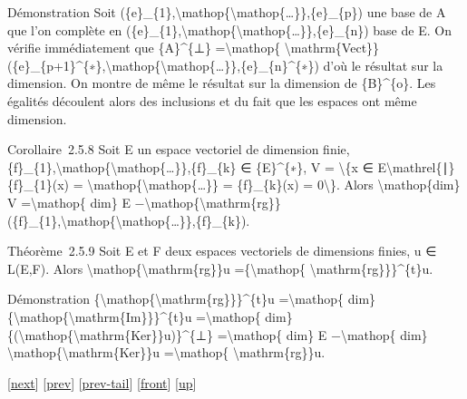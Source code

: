 \documentclass[]{article}
\begin{document}
Démonstration Soit
(\{e\}\_\{1\},\textbackslash{}mathop\{\textbackslash{}mathop\{\ldots{}\}\},\{e\}\_\{p\})
une base de A que l'on complète en
(\{e\}\_\{1\},\textbackslash{}mathop\{\textbackslash{}mathop\{\ldots{}\}\},\{e\}\_\{n\})
base de E. On vérifie immédiatement que \{A\}\^{}\{⊥\}
=\textbackslash{}mathop\{
\textbackslash{}mathrm\{Vect\}\}(\{e\}\_\{p+1\}\^{}\{∗\},\textbackslash{}mathop\{\textbackslash{}mathop\{\ldots{}\}\},\{e\}\_\{n\}\^{}\{∗\})
d'où le résultat sur la dimension. On montre de même le résultat sur la
dimension de \{B\}\^{}\{o\}. Les égalités découlent alors des inclusions
et du fait que les espaces ont même dimension.

Corollaire~2.5.8 Soit E un espace vectoriel de dimension finie,
\{f\}\_\{1\},\textbackslash{}mathop\{\textbackslash{}mathop\{\ldots{}\}\},\{f\}\_\{k\}
∈ \{E\}\^{}\{∗\}, V = \textbackslash{}\{x ∈
E\textbackslash{}mathrel\{∣\}\{f\}\_\{1\}(x) =
\textbackslash{}mathop\{\textbackslash{}mathop\{\ldots{}\}\} =
\{f\}\_\{k\}(x) = 0\textbackslash{}\}. Alors
\textbackslash{}mathop\{dim\} V =\textbackslash{}mathop\{ dim\} E
−\textbackslash{}mathop\{\textbackslash{}mathrm\{rg\}\}(\{f\}\_\{1\},\textbackslash{}mathop\{\textbackslash{}mathop\{\ldots{}\}\},\{f\}\_\{k\}).

Théorème~2.5.9 Soit E et F deux espaces vectoriels de dimensions finies,
u ∈ L(E,F). Alors
\textbackslash{}mathop\{\textbackslash{}mathrm\{rg\}\}u
=\{\textbackslash{}mathop\{ \textbackslash{}mathrm\{rg\}\}\}\^{}\{t\}u.

Démonstration
\{\textbackslash{}mathop\{\textbackslash{}mathrm\{rg\}\}\}\^{}\{t\}u
=\textbackslash{}mathop\{ dim\}
\{\textbackslash{}mathop\{\textbackslash{}mathrm\{Im\}\}\}\^{}\{t\}u
=\textbackslash{}mathop\{ dim\}
\{(\textbackslash{}mathop\{\textbackslash{}mathrm\{Ker\}\}u)\}\^{}\{⊥\}
=\textbackslash{}mathop\{ dim\} E −\textbackslash{}mathop\{ dim\}
\textbackslash{}mathop\{\textbackslash{}mathrm\{Ker\}\}u
=\textbackslash{}mathop\{ \textbackslash{}mathrm\{rg\}\}u.

{[}\href{coursse12.html}{next}{]} {[}\href{coursse10.html}{prev}{]}
{[}\href{coursse10.html\#tailcoursse10.html}{prev-tail}{]}
{[}\href{coursse11.html}{front}{]}
{[}\href{coursch3.html\#coursse11.html}{up}{]}
\end{document}

